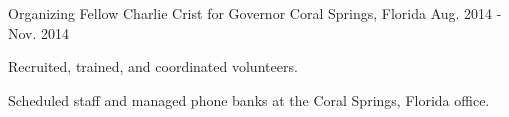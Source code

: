 \begin{cventries}
  \cventry
    {Organizing Fellow} %
    {Charlie Crist for Governor} %
    {Coral Springs, Florida} %
    {Aug. 2014 - Nov. 2014} %
    {
      \begin{cvitems} %
        \item {Recruited, trained, and coordinated volunteers.}
        \item {Scheduled staff and managed phone banks at the Coral Springs, Florida office.}
      \end{cvitems}
    }

\end{cventries}
